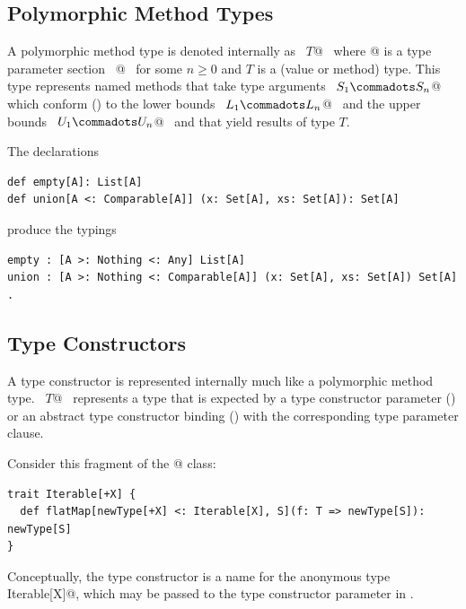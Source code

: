 \subsection{Polymorphic Method Types}
\label{sec:poly-types}

A polymorphic method type is denoted internally as ~\lstinline@[$\tps\,$]$T$@~ where
\lstinline@[$\tps\,$]@ is a type parameter section 
~\lstinline@[$a_1$ >: $L_1$ <: $U_1 \commadots a_n$ >: $L_n$ <: $U_n$]@~ 
for some $n \geq 0$ and $T$ is a
(value or method) type.  This type represents named methods that
take type arguments ~\lstinline@$S_1 \commadots S_n$@~ which
conform () to the lower bounds
~\lstinline@$L_1 \commadots L_n$@~ and the upper bounds
~\lstinline@$U_1 \commadots U_n$@~ and that yield results of type $T$.

\example The declarations
\begin{lstlisting}
def empty[A]: List[A]
def union[A <: Comparable[A]] (x: Set[A], xs: Set[A]): Set[A]
\end{lstlisting}
produce the typings
\begin{lstlisting}
empty : [A >: Nothing <: Any] List[A]
union : [A >: Nothing <: Comparable[A]] (x: Set[A], xs: Set[A]) Set[A]  .
\end{lstlisting}

\subsection{Type Constructors} %
\label{sec:higherkinded-types}
A type constructor is represented internally much like a polymorphic method type.
~\lstinline@[$\pm$ $a_1$ >: $L_1$ <: $U_1 \commadots \pm a_n$ >: $L_n$ <: $U_n$] $T$@~ represents a type that is expected by a type constructor parameter () or an abstract type constructor binding () with the corresponding type parameter clause.

\example Consider this fragment of the \lstinline@Iterable[+X]@ class:
\begin{lstlisting}
trait Iterable[+X] {
  def flatMap[newType[+X] <: Iterable[X], S](f: T => newType[S]): newType[S]
}
\end{lstlisting}

Conceptually, the type constructor \lstinline@Iterable@ is a name for the anonymous type \lstinline@[+X] Iterable[X]@, which may be passed to the \lstinline@newType@ type constructor parameter in \lstinline@flatMap@.

